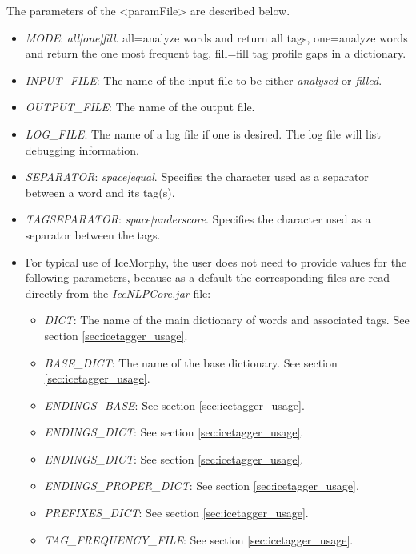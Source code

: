 \documentclass[11pt]{article}
\begin{document}
The parameters of the <paramFile> are described below.
\begin{itemize}
\item \emph{MODE}: \emph{all|one|fill}. all=analyze words and return all tags, one=analyze words and return the one most frequent tag, fill=fill tag profile gaps in a dictionary.
\item \emph{INPUT\_FILE}: The name of the input file to be either \emph{analysed} or \emph{filled}.
\item \emph{OUTPUT\_FILE}: The name of the output file.
\item \emph{LOG\_FILE}: The name of a log file if one is desired. The log file will list debugging information.
\item \emph{SEPARATOR}: \emph{space|equal}. Specifies the character used as a separator between a word and its tag(s).
\item \emph{TAGSEPARATOR}: \emph{space|underscore}. Specifies the character used as a separator between the tags.
\item For typical use of IceMorphy, the user does not need to provide values for the following parameters, because as a default the corresponding files are read directly from the \emph{IceNLPCore.jar} file:
\begin{itemize}
\item \emph{DICT}: The name of the main dictionary of words and associated tags. See section \ref{sec:icetagger_usage}.
\item \emph{BASE\_DICT}: The name of the base dictionary. See section \ref{sec:icetagger_usage}.
\item \emph{ENDINGS\_BASE}: See section \ref{sec:icetagger_usage}.
\item \emph{ENDINGS\_DICT}: See section \ref{sec:icetagger_usage}.
\item \emph{ENDINGS\_DICT}: See section \ref{sec:icetagger_usage}.
\item \emph{ENDINGS\_PROPER\_DICT}: See section \ref{sec:icetagger_usage}.
\item \emph{PREFIXES\_DICT}: See section \ref{sec:icetagger_usage}.
\item \emph{TAG\_FREQUENCY\_FILE}: See section \ref{sec:icetagger_usage}.
\end{itemize}
\end{itemize}
\end{document}
